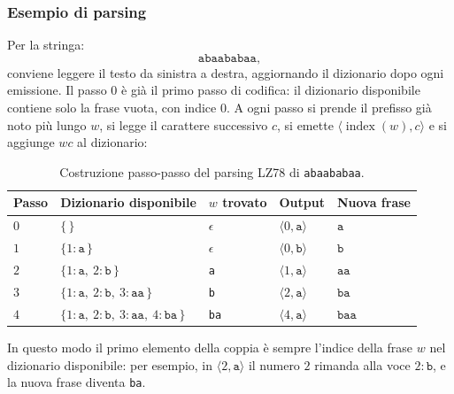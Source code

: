 \documentclass{article}
\theoremstyle{definition}
\numberwithin{equation}{section}
\begin{document}
\subsubsection{Esempio di parsing}
Per la stringa:
\[
    \texttt{abaababaa},
\]
conviene leggere il testo da sinistra a destra, aggiornando il dizionario dopo ogni emissione. Il passo $0$ è già il primo passo di codifica: il dizionario disponibile contiene solo la frase vuota, con indice $0$. A ogni passo si prende il prefisso già noto più lungo $w$, si legge il carattere successivo $c$, si emette $\langle\operatorname{index}(w),c\rangle$ e si aggiunge $wc$ al dizionario:
\begin{table}[htpb]
    \centering
    \small
    \begin{tabular}{l|l|l|l|l}
        \textbf{Passo} & \textbf{Dizionario disponibile}                                      & \textbf{$w$ trovato} & \textbf{Output}               & \textbf{Nuova frase} \\ \hline
        $0$            & $\{\,\}$                                                             & $\epsilon$           & $\langle 0,\texttt{a}\rangle$ & $\texttt{a}$         \\
        $1$            & $\{ 1:\texttt{a}\,\}$                                                & $\epsilon$           & $\langle 0,\texttt{b}\rangle$ & $\texttt{b}$         \\
        $2$            & $\{ 1:\texttt{a},\ 2:\texttt{b}\,\}$                                 & \texttt{a}           & $\langle 1,\texttt{a}\rangle$ & $\texttt{aa}$        \\
        $3$            & $\{ 1:\texttt{a},\ 2:\texttt{b},\ 3:\texttt{aa}\,\}$                 & \texttt{b}           & $\langle 2,\texttt{a}\rangle$ & $\texttt{ba}$        \\
        $4$            & $\{ 1:\texttt{a},\ 2:\texttt{b},\ 3:\texttt{aa},\ 4:\texttt{ba}\,\}$ & \texttt{ba}          & $\langle 4,\texttt{a}\rangle$ & $\texttt{baa}$
    \end{tabular}
    \caption{Costruzione passo-passo del parsing LZ78 di \texttt{abaababaa}.}
    \label{tab:lz78_abaababaa_steps}
\end{table}

In questo modo il primo elemento della coppia è sempre l'indice della frase $w$ nel dizionario disponibile: per esempio, in $\langle 2,\texttt{a}\rangle$ il numero $2$ rimanda alla voce $2:\texttt{b}$, e la nuova frase diventa \texttt{ba}.
\end{document}
